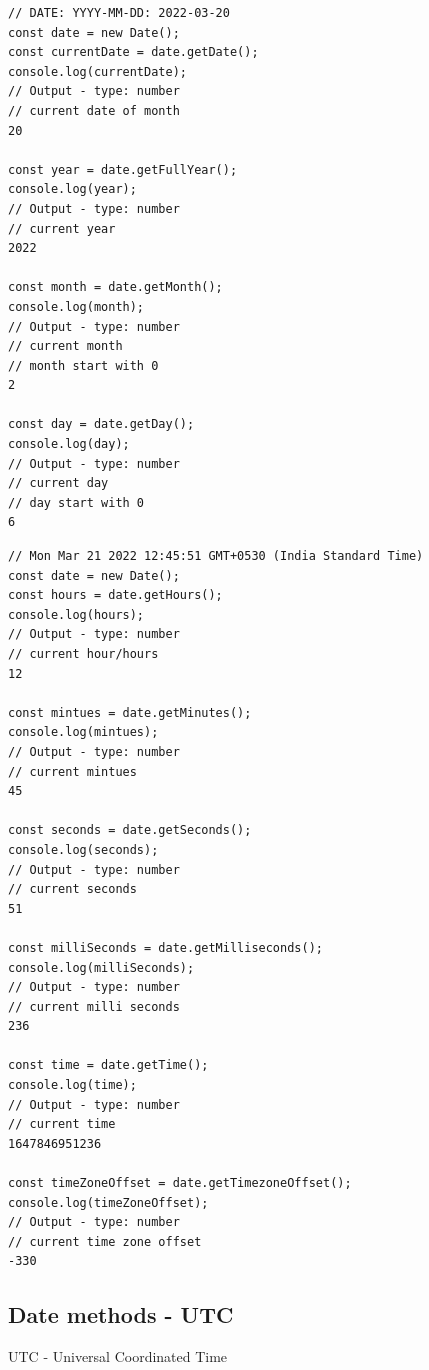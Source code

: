\documentclass[10pt]{article}
\begin{document}
\begin{lstlisting}[style=ES6, caption={Date methods - I}]
// DATE: YYYY-MM-DD: 2022-03-20
const date = new Date();
const currentDate = date.getDate();
console.log(currentDate);
// Output - type: number
// current date of month
20

const year = date.getFullYear();
console.log(year);
// Output - type: number
// current year
2022

const month = date.getMonth();
console.log(month);
// Output - type: number
// current month
// month start with 0
2

const day = date.getDay();
console.log(day);
// Output - type: number
// current day
// day start with 0
6
\end{lstlisting}
\begin{lstlisting}[style=ES6, caption={Date methods - II}]
// Mon Mar 21 2022 12:45:51 GMT+0530 (India Standard Time)
const date = new Date();
const hours = date.getHours();
console.log(hours);
// Output - type: number
// current hour/hours
12

const mintues = date.getMinutes();
console.log(mintues);
// Output - type: number
// current mintues
45

const seconds = date.getSeconds();
console.log(seconds);
// Output - type: number
// current seconds
51

const milliSeconds = date.getMilliseconds();
console.log(milliSeconds);
// Output - type: number
// current milli seconds
236

const time = date.getTime();
console.log(time);
// Output - type: number
// current time
1647846951236

const timeZoneOffset = date.getTimezoneOffset();
console.log(timeZoneOffset);
// Output - type: number
// current time zone offset
-330
\end{lstlisting}

\subsection{Date methods - UTC}

UTC - Universal Coordinated Time
\end{document}
